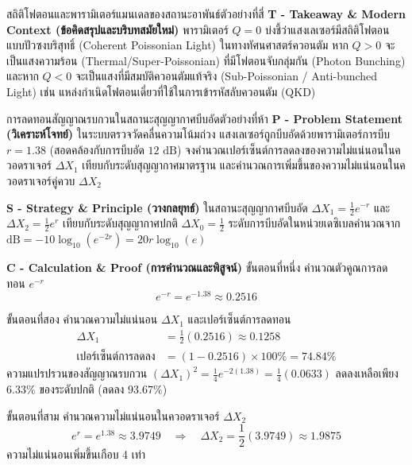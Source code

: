 \begin{psctbox}{สถิติโฟตอนและพารามิเตอร์แมนเดลของสถานะอาพันธ์}{ตัวอย่างที่สี่}
\vspace{6pt}
\noindent\textbf{T - Takeaway \& Modern Context (ข้อคิดสรุปและบริบทสมัยใหม่)} พารามิเตอร์ $Q = 0$ บ่งชี้ว่าแสงเลเซอร์มีสถิติโฟตอนแบบปัวซงบริสุทธิ์ (Coherent Poissonian Light) ในทางทัศนศาสตร์ควอนตัม หาก $Q > 0$ จะเป็นแสงความร้อน (Thermal/Super-Poissonian) ที่มีโฟตอนจับกลุ่มกัน (Photon Bunching) และหาก $Q < 0$ จะเป็นแสงที่มีสมบัติควอนตัมแท้จริง (Sub-Poissonian / Anti-bunched Light) เช่น แหล่งกำเนิดโฟตอนเดี่ยวที่ใช้ในการเข้ารหัสลับควอนตัม (QKD)
\end{psctbox}

\begin{psctbox}{การลดทอนสัญญาณรบกวนในสถานะสุญญากาศบีบอัด}{ตัวอย่างที่ห้า}
\noindent\textbf{P - Problem Statement (วิเคราะห์โจทย์)} ในระบบตรวจวัดคลื่นความโน้มถ่วง แสงเลเซอร์ถูกบีบอัดด้วยพารามิเตอร์การบีบ $r = 1.38$ (สอดคล้องกับการบีบอัด $12\text{ dB}$) จงคำนวณเปอร์เซ็นต์การลดลงของความไม่แน่นอนในควอดราเจอร์ $\Delta X_1$ เทียบกับระดับสุญญากาศมาตรฐาน และคำนวณการเพิ่มขึ้นของความไม่แน่นอนในควอดราเจอร์คู่ควบ $\Delta X_2$

\vspace{6pt}
\noindent\textbf{S - Strategy \& Principle (วางกลยุทธ์)} ในสถานะสุญญากาศบีบอัด $\Delta X_1 = \frac{1}{2}e^{-r}$ และ $\Delta X_2 = \frac{1}{2}e^r$ เทียบกับระดับสุญญากาศปกติ $\Delta X_0 = \frac{1}{2}$ ระดับการบีบอัดในหน่วยเดซิเบลคำนวณจาก $\text{dB} = -10 \log_{10}(e^{-2r}) = 20 r \log_{10}(e)$

\vspace{6pt}
\noindent\textbf{C - Calculation \& Proof (การคำนวณและพิสูจน์)}
ขั้นตอนที่หนึ่ง คำนวณตัวคูณการลดทอน $e^{-r}$
\begin{equation}
e^{-r} = e^{-1.38} \approx 0.2516
\end{equation}

ขั้นตอนที่สอง คำนวณความไม่แน่นอน $\Delta X_1$ และเปอร์เซ็นต์การลดทอน
\begin{align}
\Delta X_1 &= \frac{1}{2}(0.2516) \approx 0.1258 \\
\text{เปอร์เซ็นต์การลดลง} &= (1 - 0.2516) \times 100\% = 74.84\%
\end{align}
ความแปรปรวนของสัญญาณรบกวน $(\Delta X_1)^2 = \frac{1}{4}e^{-2(1.38)} = \frac{1}{4}(0.0633)$ ลดลงเหลือเพียง $6.33\%$ ของระดับปกติ (ลดลง $93.67\%$)

ขั้นตอนที่สาม คำนวณความไม่แน่นอนในควอดราเจอร์ $\Delta X_2$
\begin{equation}
e^r = e^{1.38} \approx 3.9749 \quad \Longrightarrow \quad \Delta X_2 = \frac{1}{2}(3.9749) \approx 1.9875
\end{equation}
ความไม่แน่นอนเพิ่มขึ้นเกือบ 4 เท่า


\end{psctbox}
